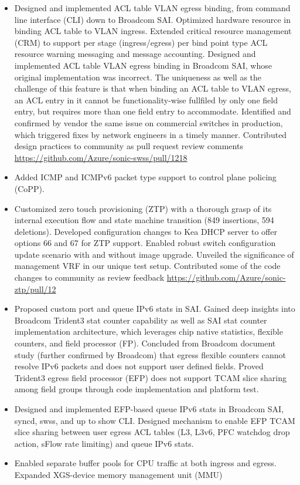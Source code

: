 \documentclass[letterpaper,11pt]{article}
\newcommand{\resitem}[1]{\item #1 \vspace{-2pt}}
\begin{document}
\begin{itemize}
\begin{itemize}
{  }
  \resitem{Designed and implemented ACL table VLAN egress binding, from command line interface (CLI) down to Broadcom SAI.
  Optimized hardware resource in binding ACL table to VLAN ingress.
  Extended critical resource management (CRM) to support per stage (ingress/egress) per bind point type
  ACL resource warning messaging and message accounting.
  Designed and implemented ACL table VLAN egress binding in Broadcom SAI, whose original implementation was incorrect.
  The uniqueness as well as the challenge of this feature is that when binding an ACL table to VLAN egress, an ACL entry in it
  cannot be functionality-wise fullfiled by only one field entry, but requires more than one field entry to accommodate.
  Identified and confirmed by vendor the same issue on commercial switches in production, which triggered fixes by network engineers
  in a timely manner.
  Contributed design practices to community as pull request review comments \url{https://github.com/Azure/sonic-swss/pull/1218}}
  \resitem{Added ICMP and ICMPv6 packet type support to control plane policing (CoPP).}
  \resitem{Customized zero touch provisioning (ZTP) with a thorough grasp of its internal execution flow and state machine
  transition (849 insertions, 594 deletions).
  Developed configuration changes to Kea DHCP server to offer options 66 and 67 for ZTP support.
  Enabled robust switch configuration update scenario with and without image upgrade.
  Unveiled the significance of management VRF in our unique test setup.
  Contributed some of the code changes to community as review feedback \url{https://github.com/Azure/sonic-ztp/pull/12}}
  \resitem{Proposed custom port and queue IPv6 stats in SAI. Gained deep insights into Broadcom Trident3 stat counter capability
  as well as SAI stat counter implementation architecture, which leverages chip native statistics, flexible counters, and field processor (FP).
  Concluded from Broadcom document study (further confirmed by Broadcom) that egress flexible counters cannot resolve IPv6 packets
  and does not support user defined fields.
  Proved Trident3 egress field processor (EFP) does not support TCAM slice sharing among field groups through code implementation and platform test.}
  \resitem{Designed and implemented EFP-based queue IPv6 stats in Broadcom SAI, syncd, swss, and up to show CLI.
  Designed mechanism to enable EFP TCAM slice sharing between user egress ACL tables (L3, L3v6, PFC watchdog drop action, sFlow rate limiting)
  and queue IPv6 stats.}
  \resitem{Enabled separate buffer pools for CPU traffic at both ingress and egress. Expanded XGS-device memory management unit (MMU)
}
\end{itemize}
\end{itemize}
\end{document}
